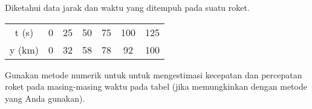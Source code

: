 \begin{soal}
Diketahui data jarak dan waktu yang ditempuh pada suatu roket.

{\centering
\begin{tabular}{|c|cccccc|}
\hline
t (s)  & 0 & 25 & 50 & 75 & 100 & 125 \\
y (km) & 0 & 32 & 58 & 78 &  92 & 100 \\
\hline
\end{tabular}
\par}

Gunakan metode numerik untuk untuk mengestimasi kecepatan dan percepatan roket
pada masing-masing waktu pada tabel (jika memungkinkan dengan metode yang Anda
gunakan).
\end{soal}


%


